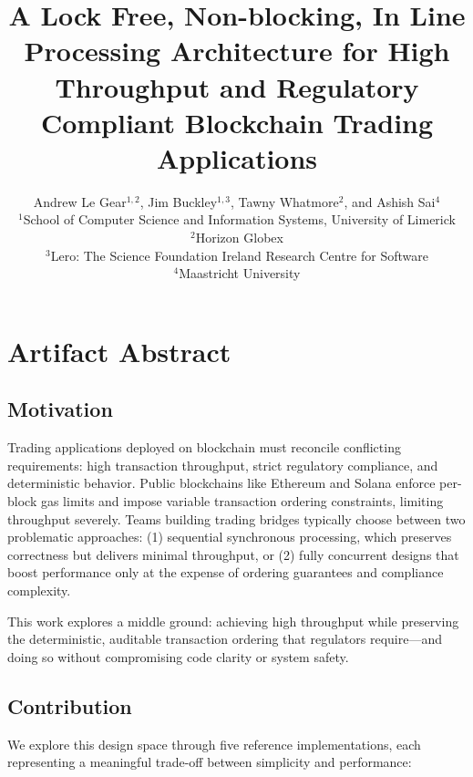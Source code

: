 \documentclass[conference]{IEEEtran}
\title{A Lock Free, Non-blocking, In Line Processing Architecture for High Throughput and Regulatory Compliant Blockchain Trading Applications}
\author{Andrew Le Gear$^{1,2}$, Jim Buckley$^{1,3}$, Tawny Whatmore$^{2}$, and Ashish Sai$^{4}$ \\
$^{1}$School of Computer Science and Information Systems, University of Limerick \\
$^{2}$Horizon Globex \\
$^{3}$Lero: The Science Foundation Ireland Research Centre for Software \\
$^{4}$Maastricht University}
\begin{document}
\section*{Artifact Abstract}

\subsection*{Motivation}

Trading applications deployed on blockchain must reconcile conflicting requirements: high transaction throughput, strict regulatory compliance, and deterministic behavior. Public blockchains like Ethereum and Solana enforce per-block gas limits and impose variable transaction ordering constraints, limiting throughput severely. Teams building trading bridges typically choose between two problematic approaches: (1) sequential synchronous processing, which preserves correctness but delivers minimal throughput, or (2) fully concurrent designs that boost performance only at the expense of ordering guarantees and compliance complexity.

This work explores a middle ground: achieving high throughput while preserving the deterministic, auditable transaction ordering that regulators require—and doing so without compromising code clarity or system safety.

\subsection*{Contribution}

We explore this design space through five reference implementations, each representing a meaningful trade-off between simplicity and performance:
\end{document}
